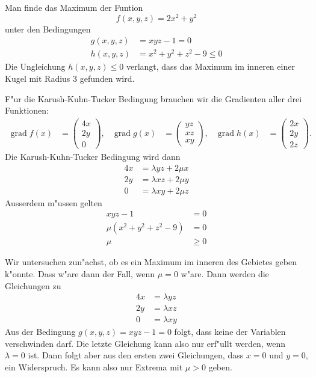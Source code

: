 \begin{beispiel}
Man finde das Maximum der Funtion
\[
f(x,y,z)=2x^2 + y^2
\]
unter den Bedingungen
\begin{align*}
g(x,y,z)&=xyz-1=0
\\
h(x,y,z)&=x^2+y^2+z^2-9 \le 0
\end{align*}
Die Ungleichung $h(x,y,z)\le 0$ verlangt, dass das Maximum
im inneren einer Kugel mit Radius $3$ gefunden wird.

\medskip
F"ur die Karush-Kuhn-Tucker Bedingung brauchen wir die
Gradienten aller drei Funktionen:
\begin{align*}
\operatorname{grad}f(x)
&=
\begin{pmatrix}4x\\2y\\0\end{pmatrix},
&
\operatorname{grad}g(x)
&=
\begin{pmatrix}yz\\xz\\xy\end{pmatrix},
&
\operatorname{grad}h(x)
&=
\begin{pmatrix}2x\\2y\\2z\end{pmatrix}.
\end{align*}
Die Karush-Kuhn-Tucker Bedingung wird dann
\begin{align*}
4x&=\lambda yz+2\mu x
\\
2y&=\lambda xz+2\mu y
\\
0&=\lambda xy + 2 \mu z
\end{align*}
Ausserdem m"ussen gelten
\begin{align*}
xyz-1&=0\\
\mu(x^2+y^2+z^2-9)&=0\\
\mu&\ge 0
\end{align*}

Wir untersuchen zun"achst, ob es ein Maximum im inneren des Gebietes
geben k"onnte. Dass w"are dann der Fall, wenn $\mu=0$ w"are. Dann
werden die Gleichungen zu
\begin{align*}
4x&=\lambda yz
\\
2y&=\lambda xz
\\
0&=\lambda xy
\end{align*}
Aus der Bedingung $g(x,y,z)=xyz-1=0$ folgt, dass keine der Variablen
verschwinden darf. Die letzte Gleichung kann also nur erf"ullt werden,
wenn $\lambda = 0$ ist. Dann folgt aber aus den ersten zwei Gleichungen,
dass $x=0$ und $y=0$, ein Widerspruch.
Es kann also nur Extrema mit $\mu >0$ geben.


\end{beispiel}
